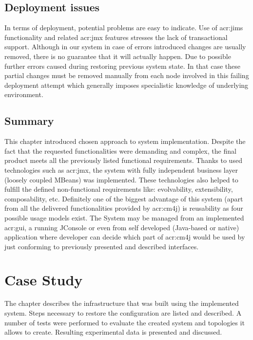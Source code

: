 \documentclass[11pt,openany]{book}
\begin{document}
    \section{Deployment issues}
    \label{sec:impl:problems}

		
      In terms of deployment, potential problems are easy to indicate. Use of \gls{acr:jims} functionality and related
      \gls{acr:jmx} features stresses the lack of transactional support. Although in our system in case of errors
      introduced changes are usually removed, there is no guarantee that it will actually happen. Due to possible
      further errors caused during restoring previous system state. In that case these partial changes must be removed
      manually from each node involved in this failing deployment attempt which generally imposes specialistic knowledge
      of underlying environment.


    \section*{Summary}
    \label{sec:impl:summary}

      This chapter introduced chosen approach to system implementation. Despite the fact that the requested
      functionalities were demanding and complex, the final product meets all the previously listed functional
      requirements. Thanks to used technologies such as \gls{acr:jmx}, the system with fully independent business layer
      (loosely coupled MBeans) was implemented. These technologies also helped to fulfill the defined non-functional
      requirements like: evolvability, extensibility, composability, etc. Definitely one of the biggest advantage of
      this system (apart from all the delivered functionalities provided by \gls{acr:cm4j}) is reusability as four
      possible usage models exist. The System may be managed from an implemented \gls{acr:gui}, a running JConsole or
      even from self developed (Java-based or native) application where developer can decide which part of
      \gls{acr:cm4j} would be used by just conforming to previously presented and described interfaces.


  \chapter{Case Study}
  \label{chap:cs}

    The chapter describes the infrastructure that was built using the implemented system. Steps necessary to restore the
    configuration are listed and described. A number of tests were performed to evaluate the created system and
    topologies it allows to create. Resulting experimental data is presented and discussed.
\end{document}
